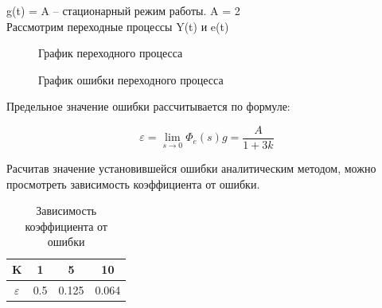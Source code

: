\documentclass[a4paper, 11pt]{article}
\begin{document}
g(t) = A – стационарный режим работы. A = 2\\

Рассмотрим переходные процессы Y(t) и e(t)

\begin{figure}[h!]
    \caption{График переходного процесса}
    \label{two}
\end{figure}

\newpage

\begin{figure}[h!]
    \caption{График ошибки переходного процесса}
    \label{tree}
\end{figure}


Предельное значение ошибки рассчитывается по формуле:

\begin{equation}
	\varepsilon = \lim_{s\to 0}{\Phi_e(s)}g =\frac {A}{1+3k}
\end{equation}

Расчитав значение установившейся ошибки аналитическим методом, можно просмотреть зависимость коэффициента от ошибки.

\begin{table}[h]
	\begin{center}
		\caption{Зависимость коэффициента от ошибки}
		\begin{tabular}{|c|c|c|c|}
			\hline
			K & 1 & 5 & 10 \\
			\hline
			$\varepsilon$ & 0.5 & 0.125 & 0.064 \\
			\hline     
		\end{tabular}
		\label{tab:my_label}
	\end{center}
\end{table}
\end{document}
